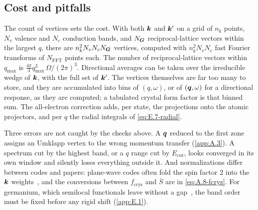 \subsection{Cost and pitfalls}

The count of vertices sets the cost. With both $\bm{k}$ and $\bm{k}'$ on a grid of $n_k$ points, $N_v$ valence and $N_c$ conduction bands, and $N_{\bm{G}}$ reciprocal-lattice vectors within the largest $q$, there are $n_k^2N_vN_cN_{\bm{G}}$ vertices, computed with $n_k^2N_vN_c$ fast Fourier transforms of $N_{\mathrm{FFT}}$ points each. The number of reciprocal-lattice vectors within $q_{\mathrm{max}}$ is $\frac{4\pi}{3}q_{\mathrm{max}}^3\,\Omega/(2\pi)^3$. Directional averages can be taken over the irreducible wedge of $\bm{k}$, with the full set of $\bm{k}'$. The vertices themselves are far too many to store, and they are accumulated into bins of $(q,\omega)$, or of $(\bm{q},\omega)$ for a directional response, as they are computed; a tabulated crystal form factor is that binned sum. The all-electron correction adds, per state, the projections onto the atomic projectors, and per $q$ the radial integrals of \cref{eq:E.7-radial}.

Three errors are not caught by the checks above. A $\bm{q}$ reduced to the first zone assigns an Umklapp vertex to the wrong momentum transfer (\cref{app:A.3}). A spectrum cut by the highest band, or a $q$ range cut by $E_{\mathrm{cut}}$, looks converged in its own window and silently loses everything outside it. And normalizations differ between codes and papers: plane-wave codes often fold the spin factor 2 into the $\bm{k}$ weights~\cite[Eq.~(4.2)]{essig2016direct}, and the conversions between $f_{\mathrm{crys}}$ and $\bar S$ are in \cref{eq:A.8-fcrys}. For germanium, which semilocal functionals leave without a gap~\cite[Sect.~2.1]{griffin2021extended}, the band order must be fixed before any rigid shift (\cref{app:E.1}).

